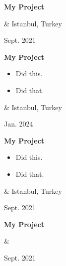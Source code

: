 \documentclass[10pt, letterpaper]{article}
\newenvironment{highlights}{
        \begin{itemize}[
                topsep=0pt,
                parsep=0.10 cm,
                partopsep=0pt,
                itemsep=0pt,
                after=\vspace{-1\baselineskip},
                leftmargin=0.4 cm + 3pt
            ]
    }{
        \end{itemize}
    } %
\let\originalTabularx\tabularx
\let\originalEndTabularx\endtabularx
\renewenvironment{tabularx}{\bgroup\centering\originalTabularx}{\originalEndTabularx\par\egroup}
\begin{document}
        \vspace{0.2 cm}
        \begin{tabularx}{
            \textwidth-0.4 cm-0.13cm
        }{
            K{0.2 cm}
            R{4.1 cm}
        }
            \textbf{My Project}

            \vspace{0.10 cm}

            &
            Istanbul, Turkey

            Sept. 2021
        \end{tabularx}


        \vspace{0.2 cm}
        \begin{tabularx}{
            \textwidth-0.4 cm-0.13cm
        }{
            K{0.2 cm}
            R{4.1 cm}
        }
            \textbf{My Project}

            \vspace{0.10 cm}

            \begin{highlights}
                \item Did this.
                \item Did that.
            \end{highlights}
            &
            Istanbul, Turkey

            Jan. 2024
        \end{tabularx}


        \vspace{0.2 cm}
        \begin{tabularx}{
            \textwidth-0.4 cm-0.13cm
        }{
            K{0.2 cm}
            R{4.1 cm}
        }
            \textbf{My Project}

            \vspace{0.10 cm}

            \begin{highlights}
                \item Did this.
                \item Did that.
            \end{highlights}
            &
            Istanbul, Turkey

            Sept. 2021
        \end{tabularx}


        \vspace{0.2 cm}
        \begin{tabularx}{
            \textwidth-0.4 cm-0.13cm
        }{
            K{0.2 cm}
            R{4.1 cm}
        }
            \textbf{My Project}

            \vspace{0.10 cm}

            &
            

            Sept. 2021
        \end{tabularx}
\end{document}
